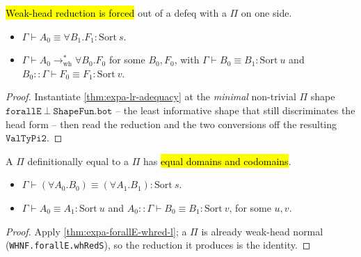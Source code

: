 \begin{theorem}
\label{thm:expa-forallE-whred-l}
\leanok
{}

 \hl{Weak-head reduction is forced} out of a defeq with a $\Pi$ on one side.
\begin{itemize}
\item {} $\Gamma\vdash A_0\equiv\forall B_1.F_1:\mathrm{Sort}\ s$.
\item {} $\Gamma\vdash A_0\to^*_{\mathrm{wh}}\forall B_0.F_0$ for some $B_0,F_0$, with
$\Gamma\vdash B_0\equiv B_1:\mathrm{Sort}\ u$ and $B_0::\Gamma\vdash F_0\equiv F_1:\mathrm{Sort}\ v$.
\end{itemize}
\end{theorem}
\begin{proof}
\leanok
{} Instantiate \ref{thm:expa-lr-adequacy} at the \emph{minimal} non-trivial $\Pi$ shape
$\mathtt{forallE}\ \bot\ \mathtt{ShapeFun.bot}$ -- the least informative shape that still
discriminates the head form -- then read the reduction and the two conversions off the resulting
$\mathtt{ValTyPi2}$.
\end{proof}

\begin{theorem}[Pi injectivity]
\label{thm:expa-forallE-inv}
\leanok
{}

 A $\Pi$ definitionally equal to a $\Pi$ has \hl{equal domains and codomains}.
\begin{itemize}
\item {} $\Gamma\vdash(\forall A_0.B_0)\equiv(\forall A_1.B_1):\mathrm{Sort}\ s$.
\item {} $\Gamma\vdash A_0\equiv A_1:\mathrm{Sort}\ u$ and
$A_0::\Gamma\vdash B_0\equiv B_1:\mathrm{Sort}\ v$, for some $u,v$.
\end{itemize}
\end{theorem}
\begin{proof}
\leanok
{} Apply \ref{thm:expa-forallE-whred-l}; a $\Pi$ is already weak-head normal
(\texttt{WHNF.forallE.whRedS}), so the reduction it produces is the identity.
\end{proof}

